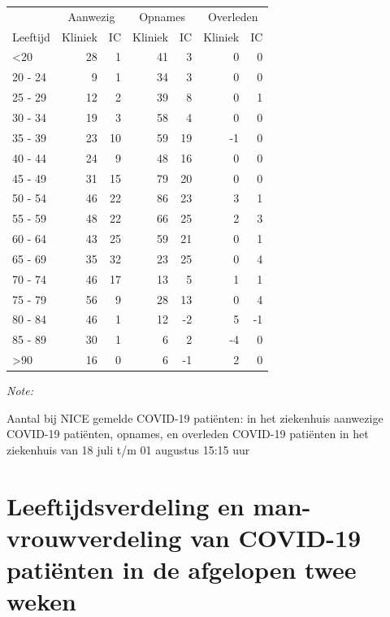 \documentclass[
  english,
  man,floatsintext]{apa6}
\begin{document}
\begin{table}
\centering\begingroup\fontsize{10}{12}\selectfont

\begin{threeparttable}
\begin{tabular}{lrrrrrr}
\toprule
\multicolumn{1}{c}{ } & \multicolumn{2}{c}{Aanwezig} & \multicolumn{2}{c}{Opnames} & \multicolumn{2}{c}{Overleden} \\
\cmidrule(l{3pt}r{3pt}){2-3} \cmidrule(l{3pt}r{3pt}){4-5} \cmidrule(l{3pt}r{3pt}){6-7}
Leeftijd & Kliniek & IC & Kliniek & IC & Kliniek & IC\\
\midrule
<20 & 28 & 1 & 41 & 3 & 0 & 0\\
20 - 24 & 9 & 1 & 34 & 3 & 0 & 0\\
25 - 29 & 12 & 2 & 39 & 8 & 0 & 1\\
30 - 34 & 19 & 3 & 58 & 4 & 0 & 0\\
35 - 39 & 23 & 10 & 59 & 19 & -1 & 0\\
40 - 44 & 24 & 9 & 48 & 16 & 0 & 0\\
45 - 49 & 31 & 15 & 79 & 20 & 0 & 0\\
50 - 54 & 46 & 22 & 86 & 23 & 3 & 1\\
55 - 59 & 48 & 22 & 66 & 25 & 2 & 3\\
60 - 64 & 43 & 25 & 59 & 21 & 0 & 1\\
65 - 69 & 35 & 32 & 23 & 25 & 0 & 4\\
70 - 74 & 46 & 17 & 13 & 5 & 1 & 1\\
75 - 79 & 56 & 9 & 28 & 13 & 0 & 4\\
80 - 84 & 46 & 1 & 12 & -2 & 5 & -1\\
85 - 89 & 30 & 1 & 6 & 2 & -4 & 0\\
>90 & 16 & 0 & 6 & -1 & 2 & 0\\
\bottomrule
\end{tabular}
\begin{tablenotes}
\item \textit{Note: } 
\item Aantal bij NICE gemelde COVID-19 patiënten: in het ziekenhuis aanwezige COVID-19 patiënten, opnames, en overleden COVID-19 patiënten in het ziekenhuis van 18 juli t/m 01 augustus 15:15 uur
\end{tablenotes}
\end{threeparttable}
\endgroup{}
\end{table}

\newpage

\hypertarget{leeftijdsverdeling-en-man-vrouwverdeling-van-covid-19-patiuxebnten-in-de-afgelopen-twee-weken}{%
\section{Leeftijdsverdeling en man-vrouwverdeling van COVID-19 patiënten in de afgelopen twee weken}\label{leeftijdsverdeling-en-man-vrouwverdeling-van-covid-19-patiuxebnten-in-de-afgelopen-twee-weken}}
\end{document}
